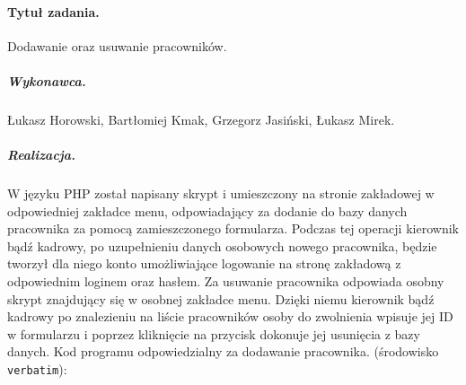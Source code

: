 \documentclass[a4paper]{article}
\begin{document}
\paragraph{Tytuł zadania.} Dodawanie oraz usuwanie pracowników.
\subparagraph{Wykonawca.} Łukasz Horowski, Bartłomiej Kmak, Grzegorz Jasiński, Łukasz Mirek.
\subparagraph{Realizacja.} W języku PHP został napisany skrypt i umieszczony na stronie zakładowej w odpowiedniej zakładce menu, odpowiadający za dodanie do bazy danych pracownika za pomocą zamieszczonego formularza. Podczas tej operacji kierownik bądź kadrowy, po uzupełnieniu danych osobowych nowego pracownika, będzie tworzył dla niego konto umożliwiające logowanie na stronę zakładową z odpowiednim loginem oraz hasłem. Za usuwanie pracownika odpowiada osobny skrypt znajdujący się w osobnej zakładce menu. Dzięki niemu kierownik bądź kadrowy po znalezieniu na liście pracowników osoby do zwolnienia wpisuje jej ID w formularzu i poprzez kliknięcie na przycisk dokonuje jej usunięcia z bazy danych.
Kod programu odpowiedzialny za dodawanie pracownika. (środowisko \texttt{verbatim}): 
\end{document}
